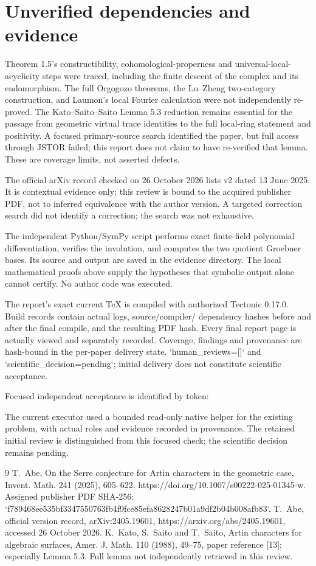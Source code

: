 \documentclass[10pt]{article}
\begin{document}
\section*{Unverified dependencies and evidence}
Theorem 1.5’s constructibility, cohomological-properness and universal-local-acyclicity steps were traced, including the finite descent of the complex and its endomorphism. The full Orgogozo theorems, the Lu–Zheng two-category construction, and Laumon’s local Fourier calculation were not independently re-proved. The Kato–Saito–Saito Lemma 5.3 reduction remains essential for the passage from geometric virtual trace identities to the full local-ring statement and positivity. A focused primary-source search identified the paper, but full access through JSTOR failed; this report does not claim to have re-verified that lemma. These are coverage limits, not asserted defects.\par
The official arXiv record checked on 26 October 2026 lists v2 dated 13 June 2025. It is contextual evidence only; this review is bound to the acquired publisher PDF, not to inferred equivalence with the author version. A targeted correction search did not identify a correction; the search was not exhaustive.\par
The independent Python/SymPy script performs exact finite-field polynomial differentiation, verifies the involution, and computes the two quotient Groebner bases. Its source and output are saved in the evidence directory. The local mathematical proofs above supply the hypotheses that symbolic output alone cannot certify. No author code was executed.\par
The report’s exact current TeX is compiled with authorized Tectonic 0.17.0. Build records contain actual logs, source/compiler/ dependency hashes before and after the final compile, and the resulting PDF hash. Every final report page is actually viewed and separately recorded. Coverage, findings and provenance are hash-bound in the per-paper delivery state. `human\_reviews=[]` and `scientific\_decision=pending`; initial delivery does not constitute scientific acceptance.\par
Focused independent acceptance is identified by token:\par
The current executor used a bounded read-only native helper for the existing problem, with actual roles and evidence recorded in provenance. The retained initial review is distinguished from this focused check; the scientific decision remains pending.\par
9 T. Abe, On the Serre conjecture for Artin characters in the geometric case, Invent. Math. 241 (2025), 605–622. https://doi.org/10.1007/s00222-025-01345-w. Assigned publisher PDF SHA-256: `f789468ee535bf3347550763fb4f9fce85efa8628247b01a9df2b04b008afb83`. T. Abe, official version record, arXiv:2405.19601, https://arxiv.org/abs/2405.19601, accessed 26 October 2026. K. Kato, S. Saito and T. Saito, Artin characters for algebraic surfaces, Amer. J. Math. 110 (1988), 49–75, paper reference [13]; especially Lemma 5.3. Full lemma not independently retrieved in this review.\par
\end{document}
